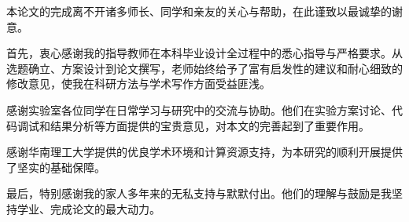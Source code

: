 
\begin{acknowledgements}

本论文的完成离不开诸多师长、同学和亲友的关心与帮助，在此谨致以最诚挚的谢意。

首先，衷心感谢我的指导教师在本科毕业设计全过程中的悉心指导与严格要求。从选题确立、方案设计到论文撰写，老师始终给予了富有启发性的建议和耐心细致的修改意见，使我在科研方法与学术写作方面受益匪浅。

感谢实验室各位同学在日常学习与研究中的交流与协助。他们在实验方案讨论、代码调试和结果分析等方面提供的宝贵意见，对本文的完善起到了重要作用。

感谢华南理工大学提供的优良学术环境和计算资源支持，为本研究的顺利开展提供了坚实的基础保障。

最后，特别感谢我的家人多年来的无私支持与默默付出。他们的理解与鼓励是我坚持学业、完成论文的最大动力。

\end{acknowledgements}

